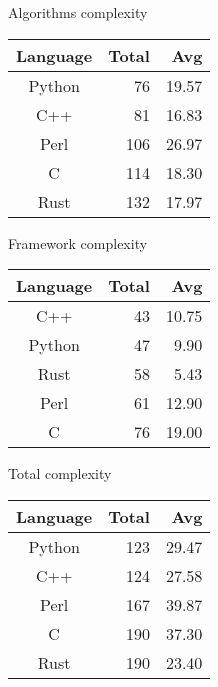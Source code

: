 \begin{subtable}{0.33\textwidth}
    \centering
    \caption{Algorithms complexity}
    \label{table:cyclomatic:algorithm}
    \begin{tabular}{|c|r|r|}
        \hline
        Language & Total & Avg \\
        \hline
        Python & 76 & 19.57 \\
        C++ & 81 & 16.83 \\
        Perl & 106 & 26.97 \\
        C & 114 & 18.30 \\
        Rust & 132 & 17.97 \\
        \hline
    \end{tabular}
\end{subtable}%
\begin{subtable}{0.33\textwidth}
    \centering
    \caption{Framework complexity}
    \label{table:cyclomatic:framework}
    \begin{tabular}{|c|r|r|}
        \hline
        Language & Total & Avg \\
        \hline
        C++ & 43 & 10.75 \\
        Python & 47 & 9.90 \\
        Rust & 58 & 5.43 \\
        Perl & 61 & 12.90 \\
        C & 76 & 19.00 \\
        \hline
    \end{tabular}
\end{subtable}%
\begin{subtable}{0.33\textwidth}
    \centering
    \caption{Total complexity}
    \label{table:cyclomatic:total}
    \begin{tabular}{|c|r|r|}
        \hline
        Language & Total & Avg \\
        \hline
        Python & 123 & 29.47 \\
        C++ & 124 & 27.58 \\
        Perl & 167 & 39.87 \\
        C & 190 & 37.30 \\
        Rust & 190 & 23.40 \\
        \hline
    \end{tabular}
\end{subtable}
